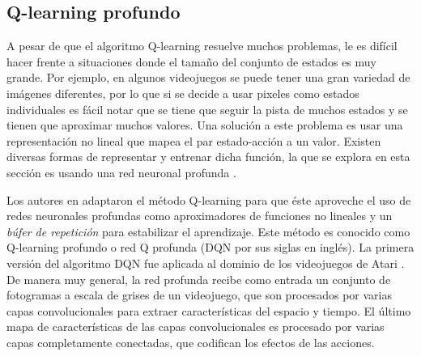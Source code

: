 	

\subsection{Q-learning profundo}

A pesar de que el algoritmo Q-learning resuelve muchos problemas, 
le es difícil hacer frente a situaciones donde el tamaño del conjunto de estados
es muy grande. Por ejemplo, en algunos videojuegos se puede tener una gran variedad
de imágenes diferentes, por lo que  si se decide a usar pixeles como 
estados individuales es fácil notar que se tiene que seguir la pista de muchos
estados y se tienen que aproximar muchos valores. 
Una solución a este problema es usar una representación no lineal que mapea 
el par estado-acción a un valor.
Existen diversas formas de representar y entrenar dicha función, la que 
se explora en esta sección es usando una red neuronal profunda \cite{lapan_2020, Goodfellow-et-al-2016}.

Los autores en \cite{mnih2013playing} adaptaron el método Q-learning 
para que éste aproveche el uso de redes neuronales profundas como aproximadores
de funciones no lineales y un \textit{búfer de repetición} para estabilizar 
el aprendizaje. Este método es conocido como Q-learning profundo o red Q profunda (DQN por sus siglas en inglés).
La primera versión del algoritmo DQN fue aplicada al dominio de los videojuegos de Atari \cite{bellemare2013arcade}. De manera muy general, la red profunda recibe como entrada un conjunto de fotogramas a escala de grises de un videojuego, que son procesados por varias capas convolucionales para
extraer características del espacio y tiempo. El último mapa de características
de las capas convolucionales es procesado por varias capas completamente conectadas, que codifican los efectos de las acciones.

